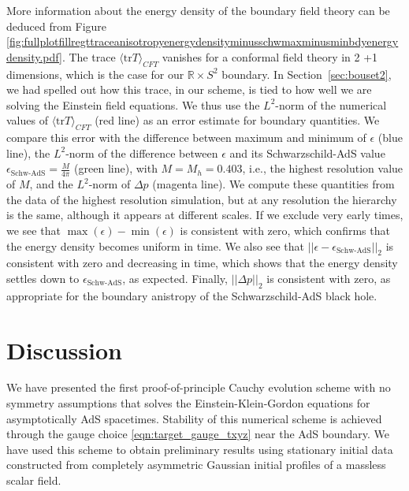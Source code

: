 \documentclass[a4paper,11pt]{article}
\numberwithin{equation}{section}
\begin{document}
More information about the energy density of the boundary field theory can be deduced from Figure \ref{fig:fullplotfillregttraceanisotropyenergydensityminusschwmaxminusminbdyenergydensity.pdf}. 
The trace $\langle \text{tr}T\rangle_{CFT}$ vanishes for a conformal field theory in 2 +1 dimensions, which is the case for our $\mathbb{R} \times S^2$ boundary.
In Section~\ref{sec:bouset2}, we had spelled out how this trace, in our scheme, is tied to how well we are solving the Einstein field equations.
We thus use the $L^2$-norm of the numerical values of $\langle \text{tr}T\rangle_{CFT}$ (red line) as an error estimate for boundary quantities. We compare this error with the difference between maximum and minimum of $\epsilon$ (blue line), the $L^2$-norm of the difference between $\epsilon$ and its Schwarzschild-AdS value $\epsilon_{\text{Schw-AdS}}=\frac{M}{4\pi}$ (green line), with $M=M_h=0.403$, i.e., the highest resolution value of $M$, and the $L^2$-norm of $\Delta p$ (magenta line). We compute these quantities from the data of the highest resolution simulation, but at any resolution the hierarchy is the same, although it appears at different scales.
If we exclude very early times, we see that $\max(\epsilon)-\min(\epsilon)$ is consistent with zero, which confirms that the energy density becomes uniform in time.
We also see that $||\epsilon-\epsilon_{\text{Schw-AdS}}||_2$ is consistent with zero and decreasing in time, which shows that the energy density settles down to $\epsilon_{\text{Schw-AdS}}$, as expected.
Finally, $||\Delta p||_2$ is consistent with zero, as appropriate for the boundary anistropy of the Schwarzschild-AdS black hole.



\section{Discussion}\label{sec:Discussion}

We have presented the first proof-of-principle Cauchy evolution scheme with no symmetry assumptions that solves the Einstein-Klein-Gordon equations for asymptotically AdS spacetimes. 
Stability of this numerical scheme is achieved through the gauge choice \eqref{eqn:target_gauge_txyz} near the AdS boundary. 
We have used this scheme to obtain preliminary results using stationary initial data constructed from completely asymmetric Gaussian initial profiles of a massless scalar field.
\end{document}
